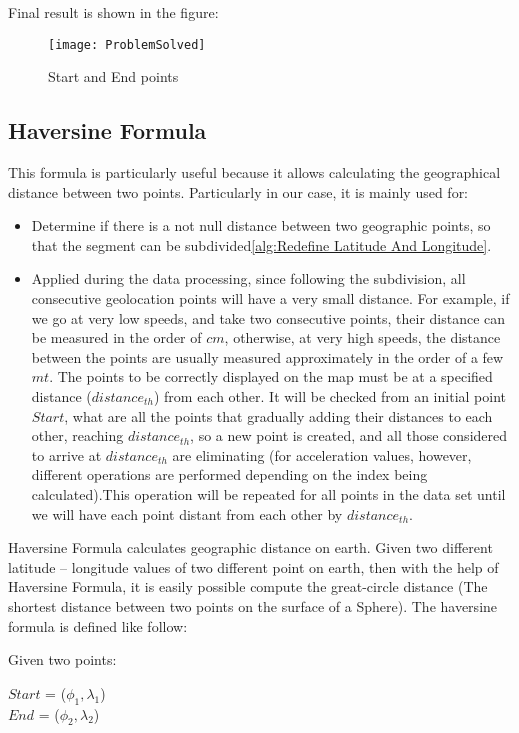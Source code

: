 \documentclass[tesi]{subfiles}
\begin{document}
Final result is shown in the figure:

\begin{figure}[H]	
\centering
\texttt{[image: ProblemSolved]} \label{Solved GPS Points Problem}
 \caption{Start and End points}
  \label{fig:Solved GPS Points Problem}
\end{figure}
\subsection{Haversine Formula} \label{ssc:Haversine Formula}
This formula is particularly useful because it allows calculating the geographical distance between two points. Particularly in our case, it is mainly used for:
\begin{itemize}
\item Determine if there is a not null distance between two geographic points, so that the segment can be subdivided\ref{alg:Redefine Latitude And Longitude}.
\item Applied during the data processing, since following the subdivision, all consecutive geolocation points will have a very small distance.
For example, if we go at very low speeds, and take two consecutive points, their distance can be measured in the order of $cm$, otherwise, at very high speeds, the distance between the points are usually measured approximately in the order of a few $mt$.
The points to be correctly displayed on the map must be at a specified distance ($distance_{th}$) from each other.
It will be checked from an initial point $Start$, what are all the points that gradually adding their distances to each other, reaching $distance_{th}$, so a new point is created, and all those considered to arrive at $distance_{th}$ are eliminating (for acceleration values, however, different operations are performed depending on the index being calculated).This operation will be repeated for all points in the data set until we will have each point distant from each other by $distance_{th}$.
\end{itemize}

\noindent Haversine Formula calculates geographic distance on earth. Given two different latitude – longitude values of two different point on earth, then with the help of Haversine Formula, it is easily possible compute the great-circle distance (The shortest distance between two points on the surface of a Sphere). 		
\noindent The haversine formula is defined like follow:

\noindent Given two points:
\begin{center}
$Start$ = ($\phi_{1} , \lambda_{1}$)\\
$End$ = ($\phi_{2} , \lambda_{2}$)
\end{center}
\end{document}
